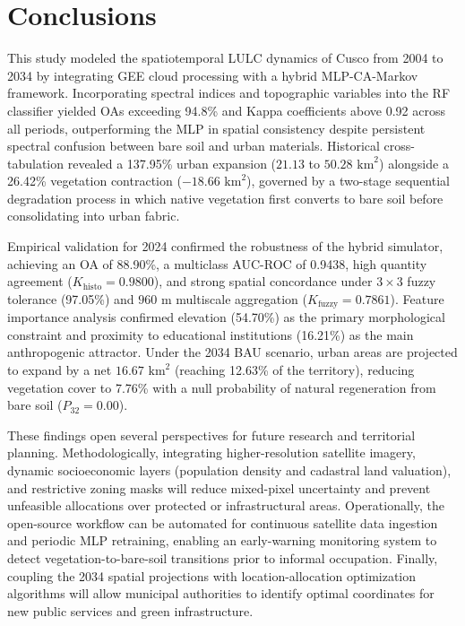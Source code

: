 \documentclass[runningheads]{llncs}
\begin{document}
\section{Conclusions}
\label{sec:conclusions}

This study modeled the spatiotemporal LULC dynamics of Cusco from 2004 to 2034 by integrating GEE cloud processing with a hybrid MLP-CA-Markov framework. Incorporating spectral indices and topographic variables into the RF classifier yielded OAs exceeding 94.8\% and Kappa coefficients above 0.92 across all periods, outperforming the MLP in spatial consistency despite persistent spectral confusion between bare soil and urban materials. Historical cross-tabulation revealed a 137.95\% urban expansion ($21.13$ to $50.28\text{ km}^2$) alongside a 26.42\% vegetation contraction ($-18.66\text{ km}^2$), governed by a two-stage sequential degradation process in which native vegetation first converts to bare soil before consolidating into urban fabric.

Empirical validation for 2024 confirmed the robustness of the hybrid simulator, achieving an OA of 88.90\%, a multiclass AUC-ROC of 0.9438, high quantity agreement ($K_{\text{histo}} = 0.9800$), and strong spatial concordance under $3 \times 3$ fuzzy tolerance (97.05\%) and $960\text{ m}$ multiscale aggregation ($K_{\text{fuzzy}} = 0.7861$). Feature importance analysis confirmed elevation (54.70\%) as the primary morphological constraint and proximity to educational institutions (16.21\%) as the main anthropogenic attractor. Under the 2034 BAU scenario, urban areas are projected to expand by a net $16.67\text{ km}^2$ (reaching 12.63\% of the territory), reducing vegetation cover to 7.76\% with a null probability of natural regeneration from bare soil ($P_{32} = 0.00$).

These findings open several perspectives for future research and territorial planning. Methodologically, integrating higher-resolution satellite imagery, dynamic socioeconomic layers (population density and cadastral land valuation), and restrictive zoning masks will reduce mixed-pixel uncertainty and prevent unfeasible allocations over protected or infrastructural areas. Operationally, the open-source workflow can be automated for continuous satellite data ingestion and periodic MLP retraining, enabling an early-warning monitoring system to detect vegetation-to-bare-soil transitions prior to informal occupation. Finally, coupling the 2034 spatial projections with location-allocation optimization algorithms will allow municipal authorities to identify optimal coordinates for new public services and green infrastructure.
\end{document}
